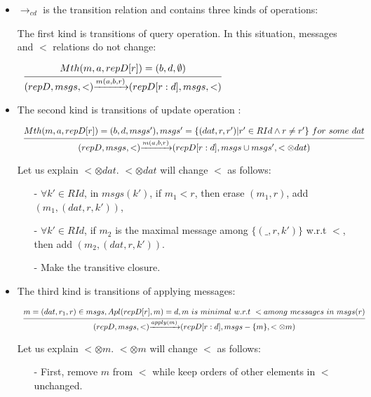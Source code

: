 {\begin {itemize}
\item[-] $\rightarrow_{cd}$ is the transition relation and contains three kinds of operations:

    The first kind is transitions of query operation. In this situation, messages and $<$ relations do not change:

    $\begin{array}{l c} \bigfrac{ Mth(m,a,repD[r]) = (b,d,\emptyset)} {(repD,msgs,<) {\xrightarrow{m(a,b,r)}} (repD[r:d],msgs,<)} \end{array}$



\item[-] The second kind is transitions of update operation :

    $\begin{array}{l c} \bigfrac{ Mth(m,a,repD[r]) = (b,d,msgs'), msgs' = \{ (dat,r,r') \vert r' \in RId \wedge r \neq r' \} \ for \ some \ dat} {(repD,msgs,<) {\xrightarrow{m(a,b,r)}} (repD[r:d],msgs \cup msgs',< \otimes dat)} \end{array}$

    Let us explain $< \otimes dat$. $< \otimes dat$ will change $<$ as follows:

    \begin{itemize}
    \setlength{\itemsep}{0.5pt}
    \item[-] $\forall k' \in RId$, in $msgs(k')$, if $m_1 < r$, then erase $(m_1,r)$, add $(m_1,(dat,r,k'))$,

    \item[-] $\forall k' \in RId$, if $m_2$ is the maximal message among $\{ (\_,r,k') \}$ w.r.t $<$, then add $(m_2,(dat,r,k'))$.

    \item[-] Make the transitive closure.
    \end{itemize}

\item[-] The third kind is transitions of applying messages:

    $\begin{array}{l c} \bigfrac{ m = (dat,r_1,r) \in msgs,Apl(repD[r],m) = d, m \ is \ minimal \ w.r.t \ < among \ messages \ in \ msgs(r) } {(repD,msgs,<) {\xrightarrow{apply(m)}} (repD[r:d],msgs - \{ m \}, < \otimes m )} \end{array}$

    Let us explain $< \otimes m$. $< \otimes m$ will change $<$ as follows:

    \begin{itemize}
    \setlength{\itemsep}{0.5pt}
    \item[-] First, remove $m$ from $<$ while keep orders of other elements in $<$ unchanged.


\end{itemize}
\end{itemize}}
